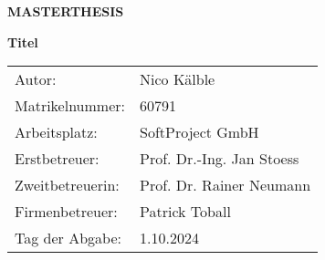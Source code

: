 \thispagestyle{empty}

\begin{figure}[h]
\centering
\begin{minipage}{0.4\textwidth}
\hfill
\end{minipage}
\hfill
\begin{minipage}{0.55\textwidth}
\hfill
{}
\end{minipage}
\end{figure}

\begin{center}
\sffamily

\vspace{2.5cm}

\huge
\textbf{MASTERTHESIS}  %
\vspace*{1cm}

\large
\textbf{Titel}  %

\vspace*{2.8cm}

\normalsize
\end{center}

\begin{tabular}{ll}
Autor: & Nico Kälble \\
Matrikelnummer: & 60791 \\
Arbeitsplatz: & SoftProject GmbH\\
Erstbetreuer: & Prof. Dr.-Ing. Jan Stoess\\
Zweitbetreuerin: & Prof. Dr. Rainer Neumann\\
Firmenbetreuer: & Patrick Toball\\
Tag der Abgabe:& 1.10.2024\\
\end{tabular}
\vspace{2cm} 



\normalsize

\clearpage


\raggedbottom
\cleardoublepage
